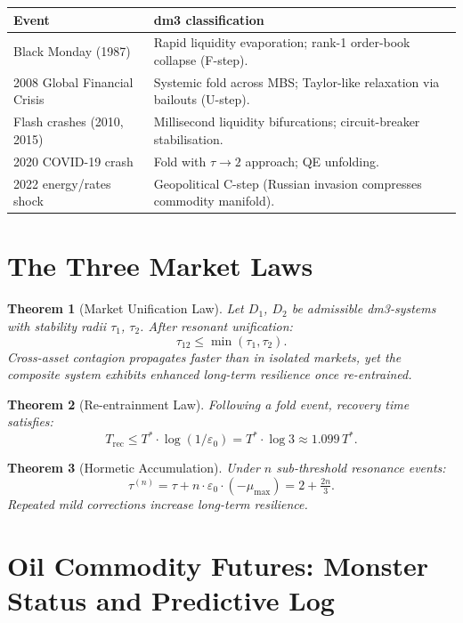\documentclass[11pt, twoside, openright]{book}
\theoremstyle{plain}
\newtheorem{theorem}{Theorem}[chapter]
\theoremstyle{definition}
\newcommand{\eps}{\varepsilon_0}
\begin{document}
\begin{tabularx}{\textwidth}{@{}P{3.5cm}L@{}}
\toprule
\textbf{Event} & \textbf{dm3 classification} \\
\midrule
Black Monday (1987) &
  Rapid liquidity evaporation; rank-1 order-book collapse (F-step). \\
2008 Global Financial Crisis &
  Systemic fold across MBS; Taylor-like relaxation via bailouts (U-step). \\
Flash crashes (2010, 2015) &
  Millisecond liquidity bifurcations; circuit-breaker stabilisation. \\
2020 COVID-19 crash &
  Fold with $\tau \to 2$ approach; QE unfolding. \\
2022 energy/rates shock &
  Geopolitical C-step (Russian invasion compresses commodity manifold). \\
\bottomrule
\end{tabularx}

\section{The Three Market Laws}

\begin{theorem}[Market Unification Law]
Let $D_1$, $D_2$ be admissible dm3-systems with stability radii
$\tau_1$, $\tau_2$. After resonant unification:
\[
\tau_{12} \le \min(\tau_1, \tau_2).
\]
Cross-asset contagion propagates faster than in isolated markets, yet
the composite system exhibits enhanced long-term resilience once
re-entrained.
\end{theorem}

\begin{theorem}[Re-entrainment Law]
Following a fold event, recovery time satisfies:
\[
T_{\mathrm{rec}} \le T^* \cdot \log(1/\eps) = T^* \cdot \log 3
\approx 1.099\,T^*.
\]
\end{theorem}

\begin{theorem}[Hormetic Accumulation]
Under $n$ sub-threshold resonance events:
\[
\tau^{(n)} = \tau + n \cdot \eps \cdot (-\mu_{\max})
           = 2 + \tfrac{2n}{3}.
\]
Repeated mild corrections increase long-term resilience.
\end{theorem}

\section{Oil Commodity Futures: Monster Status and Predictive Log}
\label{sec:oil}
\end{document}
